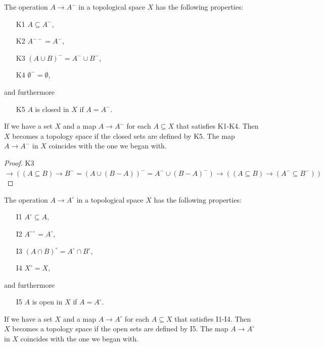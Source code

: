 \documentclass[12pt]{book}
\begin{document}
\begin{lemma}[Kuratowski]
	The operation $A\rightarrow A^-$ in a topological space $X$ has the following properties:
	\begin{enumerate}
		\item [K1] $A\subseteq A^-$,
		\item [K2] $A^{--}=A^-$,
		\item [K3] $(A\cup B)^-=A^-\cup B^-$,
		\item [K4] $\emptyset^-=\emptyset$,
	\end{enumerate}
	and furthermore
	\begin{enumerate}
		\item [K5] $A$ is closed in $X$ if $A=A^-$.
	\end{enumerate}
	
	If we have a set $X$ and a map $A\rightarrow A^-$ for each $A\subseteq X$ that satisfies K1-K4. Then $X$ becomes a topology space if the closed sets are defined by K5. The map $A\rightarrow A^-$ in $X$ coincides with the one we began with.
	\label{lem:Kurato}
\end{lemma}
\begin{proof}
	K3 $\rightarrow ((A\subseteq B)\rightarrow B^-=(A\cup(B-A))^-=A^-\cup(B-A)^-)\rightarrow((A\subseteq B)\rightarrow (A^-\subseteq B^-))$
\end{proof}

\begin{lemma}
	The operation $A\rightarrow A^\circ$ in a topological space $X$ has the following properties:
	\begin{enumerate}
		\item [I1] $A^\circ\subseteq A$,
		\item [I2] $A^{\circ\circ}=A^\circ$,
		\item [I3] $(A\cap B)^\circ=A^\circ\cap B^\circ$,
		\item [I4] $X^\circ=X$,
	\end{enumerate}
	and furthermore
	\begin{enumerate}
		\item [I5] $A$ is open in $X$ if $A=A^\circ$.
	\end{enumerate}
	
	If we have a set $X$ and a map $A\rightarrow A^\circ$ for each $A\subseteq X$ that satisfies I1-I4. Then $X$ becomes a topology space if the open sets are defined by I5. The map $A\rightarrow A^\circ$ in $X$ coincides with the one we began with.
\end{lemma}
\end{document}
